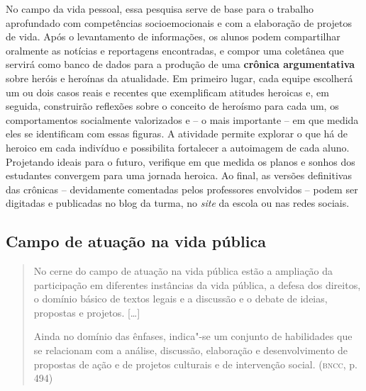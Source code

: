 \documentclass{extarticle}
\begin{document}
No campo da vida pessoal, essa pesquisa serve de base para o trabalho
aprofundado com competências socioemocionais e com a elaboração de
projetos de vida. Após o levantamento de informações, os alunos podem
compartilhar oralmente as notícias e reportagens encontradas, e compor
uma coletânea que servirá como banco de dados para a produção de uma
\textbf{crônica argumentativa} sobre heróis e heroínas da atualidade. Em
primeiro lugar, cada equipe escolherá um ou dois casos reais e recentes
que exemplificam atitudes heroicas e, em seguida, construirão reflexões
sobre o conceito de heroísmo para cada um, os comportamentos socialmente
valorizados e -- o mais importante -- em que medida eles se identificam
com essas figuras. A atividade permite explorar o que há de heroico em
cada indivíduo e possibilita fortalecer a autoimagem de cada aluno.
Projetando ideais para o futuro, verifique em que medida os planos e
sonhos dos estudantes convergem para uma jornada heroica. Ao final, as
versões definitivas das crônicas -- devidamente comentadas pelos
professores envolvidos -- podem ser digitadas e publicadas no blog da
turma, no \emph{site} da escola ou nas redes sociais.

\subsection{Campo de atuação na vida pública}

\begin{quote}
No cerne do campo de atuação na vida pública estão a ampliação da
participação em diferentes instâncias da vida pública, a defesa dos
direitos, o domínio básico de textos legais e a discussão e o debate de
ideias, propostas e projetos. {[}\ldots{}{]}

Ainda no domínio das ênfases, indica"-se um conjunto de habilidades que
se relacionam com a análise, discussão, elaboração e desenvolvimento de
propostas de ação e de projetos culturais e de intervenção social.
(\textsc{bncc}, p. 494)
\end{quote}
\end{document}
